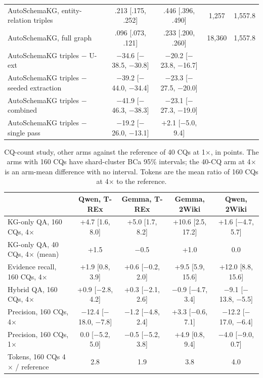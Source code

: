 \begin{table}[t]
\begin{tabular}{lcccc}
AutoSchemaKG, entity-relation triples & .213 [.175, .252] & .446 [.396, .490] & 1,257 & 1,557.8 \\
AutoSchemaKG, full graph & .096 [.073, .121] & .233 [.200, .260] & 18,360 & 1,557.8 \\
AutoSchemaKG triples $-$ U-ext & $-$34.6 [$-$38.5, $-$30.8] & $-$20.2 [$-$23.8, $-$16.7] & & \\
AutoSchemaKG triples $-$ seeded extraction & $-$39.2 [$-$44.0, $-$34.4] & $-$23.3 [$-$27.5, $-$20.0] & & \\
AutoSchemaKG triples $-$ combined & $-$41.9 [$-$46.3, $-$38.3] & $-$23.1 [$-$27.3, $-$19.0] & & \\
AutoSchemaKG triples $-$ single pass & $-$19.2 [$-$26.0, $-$13.1] & $+$2.1 [$-$5.0, 9.4] & & \\
\bottomrule
\end{tabular}
\end{table}


\begin{table}[!ht]
\centering
\caption{CQ-count study, other arms against the reference of 40 CQs at 1$\times$, in points. The arms with 160 CQs have shard-cluster BCa 95\% intervals; the 40-CQ arm at 4$\times$ is an arm-mean difference with no interval. Tokens are the mean ratio of 160 CQs at 4$\times$ to the reference.}
\label{tab:exp9other}
\scriptsize\setlength{\tabcolsep}{2.5pt}
\begin{tabular}{p{4.1cm}cccc}
\toprule
 & Qwen, T-REx & Gemma, T-REx & Gemma, 2Wiki & Qwen, 2Wiki \\
\midrule
KG-only QA, 160 CQs, 4$\times$ & +4.7 [1.6, 8.0] & +5.0 [1.7, 8.2] & +10.6 [2.5, 17.2] & +1.6 [$-$4.7, 5.7] \\
KG-only QA, 40 CQs, 4$\times$ (mean) & +1.5 & $-$0.5 & +1.0 & 0.0 \\
Evidence recall, 160 CQs, 4$\times$ & +1.9 [0.8, 3.9] & +0.6 [$-$0.2, 2.0] & +9.5 [5.9, 15.6] & +12.0 [8.8, 15.6] \\
Hybrid QA, 160 CQs, 4$\times$ & +0.9 [$-$2.8, 4.2] & +0.3 [$-$2.1, 2.6] & $-$0.9 [$-$4.7, 3.4] & $-$9.1 [$-$13.8, $-$5.5] \\
Precision, 160 CQs, 4$\times$ & $-$12.4 [$-$18.0, $-$7.8] & $-$1.2 [$-$4.8, 2.4] & +3.3 [$-$0.6, 7.1] & $-$12.2 [$-$17.0, $-$6.4] \\
Precision, 160 CQs, 1$\times$ & 0.0 [$-$5.2, 5.0] & $-$0.5 [$-$5.2, 3.8] & +4.9 [0.8, 9.4] & $-$4.0 [$-$9.0, 0.7] \\
Tokens, 160 CQs 4$\times$ / reference & 2.8 & 1.9 & 3.8 & 4.0 \\
\bottomrule
\end{tabular}
\end{table}


